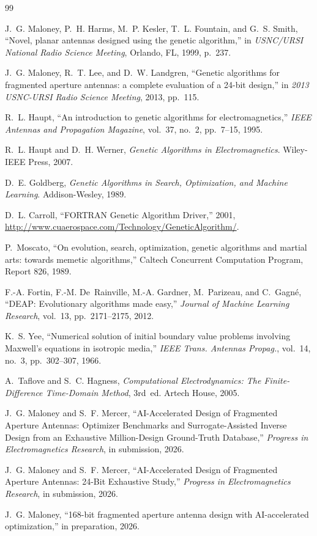 \begin{thebibliography}{99}

J.~G. Maloney, P.~H. Harms, M.~P. Kesler, T.~L. Fountain, and G.~S. Smith,
``Novel, planar antennas designed using the genetic algorithm,'' in
\emph{USNC/URSI National Radio Science Meeting}, Orlando, FL, 1999, p.~237.

J.~G. Maloney, R.~T. Lee, and D.~W. Landgren,
``Genetic algorithms for fragmented aperture antennas: a complete
evaluation of a 24-bit design,'' in \emph{2013 USNC-URSI Radio Science
Meeting}, 2013, pp.~115.

R.~L. Haupt, ``An introduction to genetic algorithms for
electromagnetics,'' \emph{IEEE Antennas and Propagation Magazine},
vol.~37, no.~2, pp.~7--15, 1995.

R.~L. Haupt and D.~H. Werner, \emph{Genetic Algorithms in
Electromagnetics}. Wiley-IEEE Press, 2007.

D.~E. Goldberg, \emph{Genetic Algorithms in Search, Optimization, and
Machine Learning}. Addison-Wesley, 1989.

D.~L. Carroll, ``FORTRAN Genetic Algorithm Driver,'' 2001,
\url{http://www.cuaerospace.com/Technology/GeneticAlgorithm/}.

P.~Moscato, ``On evolution, search, optimization, genetic algorithms and
martial arts: towards memetic algorithms,'' Caltech Concurrent Computation
Program, Report 826, 1989.

F.-A. Fortin, F.-M. De~Rainville, M.-A. Gardner, M.~Parizeau, and C.~Gagn\'e,
``DEAP: Evolutionary algorithms made easy,'' \emph{Journal of Machine
Learning Research}, vol.~13, pp.~2171--2175, 2012.

K.~S. Yee, ``Numerical solution of initial boundary value problems
involving Maxwell's equations in isotropic media,'' \emph{IEEE Trans.
Antennas Propag.}, vol.~14, no.~3, pp.~302--307, 1966.

A.~Taflove and S.~C. Hagness, \emph{Computational Electrodynamics: The
Finite-Difference Time-Domain Method}, 3rd~ed. Artech House, 2005.

J.~G. Maloney and S.~F. Mercer, ``AI-Accelerated Design of Fragmented
Aperture Antennas: Optimizer Benchmarks and Surrogate-Assisted Inverse
Design from an Exhaustive Million-Design Ground-Truth Database,''
\emph{Progress in Electromagnetics Research}, in submission, 2026.

J.~G. Maloney and S.~F. Mercer, ``AI-Accelerated Design of Fragmented
Aperture Antennas: 24-Bit Exhaustive Study,'' \emph{Progress in
Electromagnetics Research}, in submission, 2026.

J.~G. Maloney, ``168-bit fragmented aperture antenna design with
AI-accelerated optimization,'' in preparation, 2026.

\end{thebibliography}
